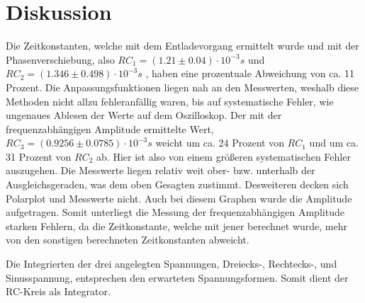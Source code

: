 \section{Diskussion}
\label{sec:Diskussion}


Die Zeitkonstanten, welche mit dem Entladevorgang ermittelt wurde und mit der Phasenverschiebung, also $RC_1 = (1.21 \pm 0.04)\cdot 10^{-3} s$ 
und $RC_2 = (1.346 \pm 0.498) \cdot 10^{-3} s$ , haben eine prozentuale Abweichung von ca. 11 Prozent. 
Die Anpassungsfunktionen liegen nah an den Messwerten, weshalb diese Methoden nicht allzu fehleranfällig waren, bis auf systematische Fehler,
wie ungenaues Ablesen der Werte auf dem Oszilloskop. Der mit der frequenzabhängigen Amplitude ermittelte Wert, $RC_3 = (0.9256\pm  0.0785)\cdot 10^{-3} s$
weicht um ca. 24 Prozent von $RC_1$ und um ca. 31 Prozent von $RC_2$ ab. Hier ist also von einem größeren systematischen Fehler auszugehen.
Die Messwerte liegen relativ weit ober- bzw. unterhalb der Ausgleichsgeraden, was dem oben Gesagten zustimmt. 
Desweiteren decken sich Polarplot und Messwerte nicht. Auch bei diesem Graphen wurde die Amplitude aufgetragen. Somit unterliegt 
die Messung der frequenzabhängigen Amplitude starken Fehlern, da die Zeitkonstante, welche mit jener berechnet wurde, mehr von den
sonstigen berechneten Zeitkonstanten abweicht.

\noindent Die Integrierten der drei angelegten Spannungen, Dreiecks-, Rechtecks-, und Sinusspannung, entsprechen den erwarteten Spannungsformen.
Somit dient der RC-Kreis als Integrator.